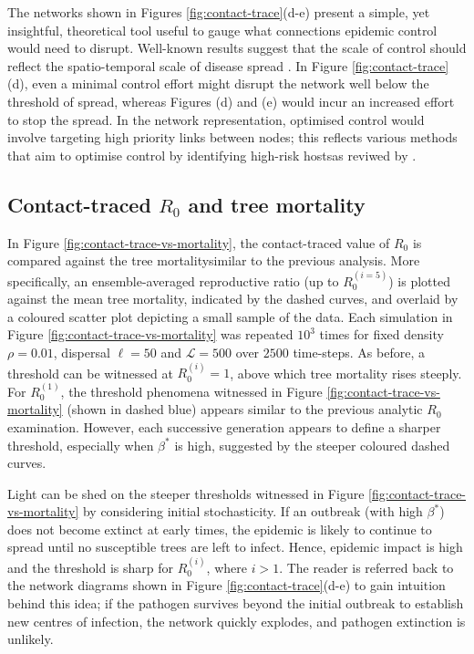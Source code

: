 The networks shown in Figures \ref{fig:contact-trace}(d-e) present a simple, yet insightful, theoretical tool useful to gauge what connections epidemic control would need to disrupt.
Well-known results suggest that the scale of control should reflect the spatio-temporal scale of disease spread \cite{control-scale-matching}.
In Figure \ref{fig:contact-trace}(d), even a minimal control effort might disrupt the network well below the threshold of spread,
whereas Figures (d) and (e) would incur an increased effort to stop the spread.
In the network representation, optimised control would involve targeting high priority links between nodes;
this reflects various methods that aim to optimise control by identifying high-risk hosts\textemdash as reviwed by \cite{surveillance-review}.

\newpage

\subsection{Contact-traced $R_0$ and tree mortality}

In Figure \ref{fig:contact-trace-vs-mortality}, the contact-traced value of $R_0$ is compared against the tree mortality\textemdash similar to the previous analysis.
More specifically, an ensemble-averaged reproductive ratio (up to $R_0^{(i=5)}$) is plotted against the mean tree mortality, indicated by the dashed curves, and overlaid by a coloured scatter plot depicting a small sample of the data.
Each simulation in Figure \ref{fig:contact-trace-vs-mortality} was repeated $10^3$ times for fixed density $\rho=0.01$, dispersal $\ell=50$ and $\mathcal{L}=500$ over $2500$ time-steps.
As before, a threshold can be witnessed at $R_0^{(i)}=1$, above which tree mortality rises steeply.
For $R_0^{(1)}$, the threshold phenomena witnessed in Figure \ref{fig:contact-trace-vs-mortality} (shown in dashed blue) appears similar to the previous analytic $R_0$ examination.
However, each successive generation appears to define a sharper threshold, especially when $\beta^*$ is high, suggested by the steeper coloured dashed curves.

Light can be shed on the steeper thresholds witnessed in Figure \ref{fig:contact-trace-vs-mortality} 
by considering initial stochasticity.
If an outbreak (with high $\beta^*$) does not become extinct at early times, the epidemic is likely to continue to spread until no susceptible trees are left to infect.
Hence, epidemic impact is high and the threshold is sharp for $R_0^{(i)}$, where $i > 1$. 
The reader is referred back to the network diagrams shown in Figure \ref{fig:contact-trace}(d-e) to gain intuition behind this idea;
if the pathogen survives beyond the initial outbreak to establish new centres of infection, the network quickly explodes, and pathogen extinction is unlikely.

